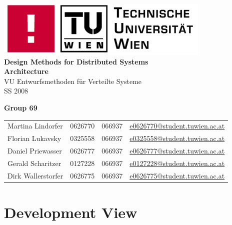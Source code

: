 \documentclass[a4paper]{article}
\begin{document}
\begin{titlepage}
	\bigskip
	\bigskip
	\bigskip
	\begin{center}
		\includegraphics{informatik-tuwien.png}\\
		\vspace{1cm}
		\Huge{\textsf{\textbf{Design Methods for Distributed Systems\\}}}
		\vspace{1cm}
		\huge{\textsf{\textbf{Architecture\\}}}
		\vspace{1cm}
		\LARGE{\textsf{VU Entwurfsmethoden f\"{u}r Verteilte Systeme\\}}
		\vspace{1cm}
		\Large{\textsf{SS 2008\\}}
	\end{center}
	\bigskip
	\begin{center}
		\large{\textsf{\textbf{Group 69}}}
	\end{center}
	\begin{tabular}{llll}
	\textsf{Martina Lindorfer} & \textsf{0626770} & \textsf{066937} & \url{e0626770@student.tuwien.ac.at}\\
	\textsf{Florian Lukavsky} & \textsf{0325558} & \textsf{066937} & \url{e0325558@student.tuwien.ac.at}\\
	\textsf{Daniel Priewasser} & \textsf{0626777} & \textsf{066937} & \url{e0626777@student.tuwien.ac.at}\\
	\textsf{Gerald Scharitzer} & \textsf{0127228} & \textsf{066937} & \url{e0127228@student.tuwien.ac.at}\\
	\textsf{Dirk Wallerstorfer} & \textsf{0626775} & \textsf{066937} & \url{e0626775@student.tuwien.ac.at}\\
	\end{tabular}
\end{titlepage}

\clearpage

\pagestyle{fancy}				
\cfoot{\small{\thepage\ / \pageref{LastPage}}}

\tableofcontents

\newpage


\section{Development View}
\end{document}
